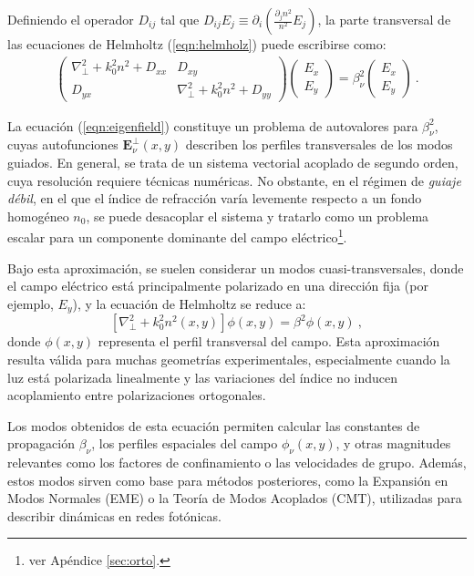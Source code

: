 Definiendo el operador \( D_{ij} \) tal que \( D_{ij} E_j \equiv \partial_i\left(\frac{\partial_j n^2}{n^2}E_j \right) \), la parte transversal de las ecuaciones de Helmholtz (\ref{eqn:helmholz}) puede escribirse como:
\begin{align}
	\begin{pmatrix}
		\nabla_\perp^2  + k_0^2n^2 + D_{xx} & D_{xy} 
		\\
		D_{yx}  & \nabla_\perp^2  + k_0^2n^2 + D_{yy} 
	\end{pmatrix}
	\begin{pmatrix}
		E_x
		\\
		E_y
	\end{pmatrix}
	=
	\beta_\nu^2 
	\begin{pmatrix}
		E_x
		\\
		E_y
	\end{pmatrix} \ . \label{eqn:eigenfield}
\end{align}

La ecuación (\ref{eqn:eigenfield}) constituye un problema de autovalores para \( \beta_\nu^2 \), cuyas autofunciones \( \textbf{E}_\nu^\perp(x,y) \) describen los perfiles transversales de los modos guiados. En general, se trata de un sistema vectorial acoplado de segundo orden, cuya resolución requiere técnicas numéricas. No obstante, en el régimen de \textit{guiaje débil}, en el que el índice de refracción varía levemente respecto a un fondo homogéneo \( n_0 \), se puede desacoplar el sistema y tratarlo como un problema escalar para un componente dominante del campo eléctrico\footnote{ver Apéndice \ref{sec:orto}.}.

Bajo esta aproximación, se suelen considerar un modos cuasi-transversales, donde el campo eléctrico está principalmente polarizado en una dirección fija (por ejemplo, \( E_y \)), y la ecuación de Helmholtz se reduce a:
\begin{equation}
	\left[\nabla_\perp^2 + k_0^2 n^2(x,y) \right] \phi(x,y) = \beta^2 \phi(x,y) \ ,
\end{equation}
donde \( \phi(x,y) \) representa el perfil transversal del campo. Esta aproximación resulta válida para muchas geometrías experimentales, especialmente cuando la luz está polarizada linealmente y las variaciones del índice no inducen acoplamiento entre polarizaciones ortogonales.

Los modos obtenidos de esta ecuación permiten calcular las constantes de propagación \( \beta_\nu \), los perfiles espaciales del campo \( \phi_\nu(x,y) \), y otras magnitudes relevantes como los factores de confinamiento o las velocidades de grupo. Además, estos modos sirven como base para métodos posteriores, como la Expansión en Modos Normales (EME) o la Teoría de Modos Acoplados (CMT), utilizadas para describir dinámicas en redes fotónicas.
